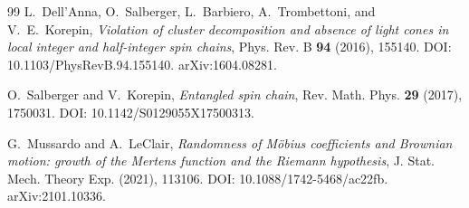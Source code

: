 \documentclass[11pt]{amsart}
\numberwithin{equation}{section}
\theoremstyle{plain}
\theoremstyle{definition}
\theoremstyle{remark}
\begin{document}
\begin{thebibliography}{99}
L.~Dell'Anna, O.~Salberger, L.~Barbiero, A.~Trombettoni, and V.~E.~Korepin,
\emph{Violation of cluster decomposition and absence of light cones in local integer and half-integer spin chains},
Phys. Rev. B \textbf{94} (2016), 155140.
DOI: 10.1103/PhysRevB.94.155140.
arXiv:1604.08281.

O.~Salberger and V.~Korepin,
\emph{Entangled spin chain},
Rev. Math. Phys. \textbf{29} (2017), 1750031.
DOI: 10.1142/S0129055X17500313.

G.~Mussardo and A.~LeClair,
\emph{Randomness of M\"obius coefficients and Brownian motion: growth of the Mertens function and the Riemann hypothesis},
J. Stat. Mech. Theory Exp. (2021), 113106.
DOI: 10.1088/1742-5468/ac22fb.
arXiv:2101.10336.

\end{thebibliography}
\end{document}
